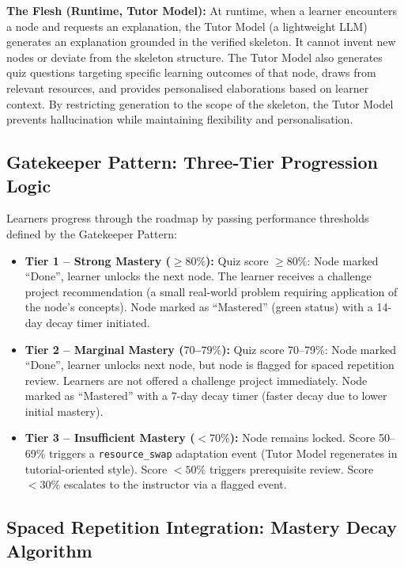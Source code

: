 \textbf{The Flesh (Runtime, Tutor Model):} At runtime, when a learner encounters a node and requests an explanation, the Tutor Model (a lightweight LLM) generates an explanation grounded in the verified skeleton. It cannot invent new nodes or deviate from the skeleton structure. The Tutor Model also generates quiz questions targeting specific learning outcomes of that node, draws from relevant resources, and provides personalised elaborations based on learner context. By restricting generation to the scope of the skeleton, the Tutor Model prevents hallucination while maintaining flexibility and personalisation.

\subsection{Gatekeeper Pattern: Three-Tier Progression Logic}

Learners progress through the roadmap by passing performance thresholds defined by the Gatekeeper Pattern:

\begin{itemize}
    \item \textbf{Tier 1 -- Strong Mastery ($\ge 80\%$):} Quiz score $\ge 80\%$: Node marked \enquote{Done}, learner unlocks the next node. The learner receives a challenge project recommendation (a small real-world problem requiring application of the node's concepts). Node marked as \enquote{Mastered} (green status) with a 14-day decay timer initiated.
    \item \textbf{Tier 2 -- Marginal Mastery ($70$--$79\%$):} Quiz score 70--79\%: Node marked \enquote{Done}, learner unlocks next node, but node is flagged for spaced repetition review. Learners are not offered a challenge project immediately. Node marked as \enquote{Mastered} with a 7-day decay timer (faster decay due to lower initial mastery).
    \item \textbf{Tier 3 -- Insufficient Mastery ($< 70\%$):} Node remains locked. Score 50--69\% triggers a \texttt{resource\_swap} adaptation event (Tutor Model regenerates in tutorial-oriented style). Score $<50\%$ triggers prerequisite review. Score $<30\%$ escalates to the instructor via a flagged event.
\end{itemize}

\subsection{Spaced Repetition Integration: Mastery Decay Algorithm}

